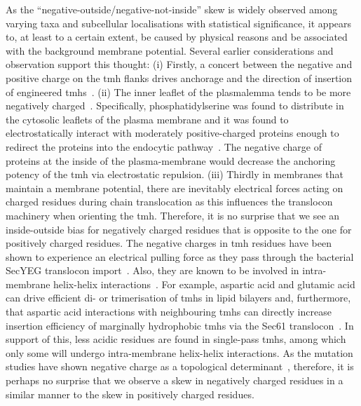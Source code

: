 As the ``negative-outside/negative-not-inside'' skew is widely observed among varying taxa and subcellular localisations with statistical significance, it appears to, at least to a certain extent, be caused by physical reasons and be associated with the background membrane potential. Several earlier considerations and observation support this thought: (i) Firstly, a concert between the negative and positive charge on the \gls{tmh} flanks drives anchorage and the direction of insertion of engineered \gls{tmh}s~\cite{Sipos1993, Hartmann1989}. (ii) The inner leaflet of the plasmalemma tends to be more negatively charged~\cite{Zachowski1993}. Specifically, phosphatidylserine was found to distribute in the cytosolic leaflets of the plasma membrane and it was found to electrostatically interact with moderately positive-charged proteins enough to redirect the proteins into the endocytic pathway~\cite{Yeung2008}. The negative charge of proteins at the inside of the plasma-membrane would decrease the anchoring potency of the \gls{tmh} via electrostatic repulsion. (iii) Thirdly in membranes that maintain a membrane potential, there are inevitably electrical forces acting on charged residues during chain translocation as this influences the translocon machinery when orienting the \gls{tmh}. Therefore, it is no surprise that we see an inside-outside bias for negatively charged residues that is opposite to the one for positively charged residues. The negative charges in \gls{tmh} residues have been shown to experience an electrical pulling force as they pass through the bacterial SecYEG translocon import~\cite{Ismail2012, Ismail2015}. Also, they are known to be involved in intra-membrane helix-helix interactions~\cite{Meindl-Beinker2006}. For example, aspartic acid and glutamic acid can drive efficient di- or trimerisation of \gls{tmh}s in lipid bilayers and, furthermore, that aspartic acid interactions with neighbouring \gls{tmh}s can directly increase insertion efficiency of marginally hydrophobic \gls{tmh}s via the Sec61 translocon~\cite{Meindl-Beinker2006}. In support of this, less acidic residues are found in single-pass \gls{tmh}s, among which only some will undergo intra-membrane helix-helix interactions. As the mutation studies have shown negative charge as a topological determinant~\cite{Nilsson1990}, therefore, it is perhaps no surprise that we observe a skew in negatively charged residues in a similar manner to the skew in positively charged residues.

